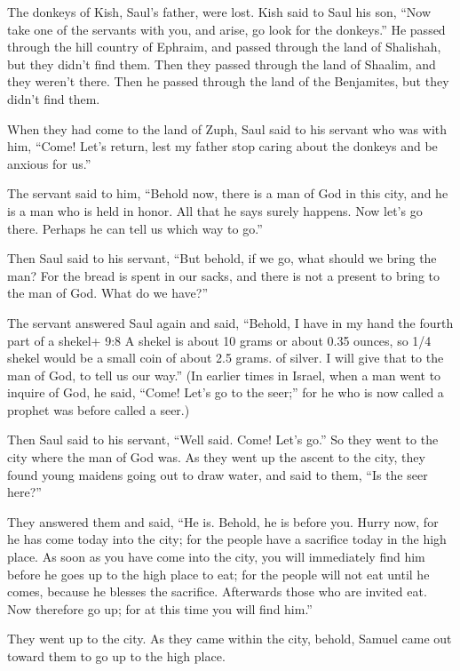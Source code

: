  The donkeys of Kish, Saul's father, were lost. Kish said to
Saul his son, ``Now take one of the servants with you, and arise, go
look for the donkeys.''  He passed through the hill country
of Ephraim, and passed through the land of Shalishah, but they didn't
find them. Then they passed through the land of Shaalim, and they
weren't there. Then he passed through the land of the Benjamites, but
they didn't find them.

 When they had come to the land of Zuph, Saul said to his
servant who was with him, ``Come! Let's return, lest my father stop
caring about the donkeys and be anxious for us.''

 The servant said to him, ``Behold now, there is a man of
God in this city, and he is a man who is held in honor. All that he says
surely happens. Now let's go there. Perhaps he can tell us which way to
go.''

 Then Saul said to his servant, ``But behold, if we go, what
should we bring the man? For the bread is spent in our sacks, and there
is not a present to bring to the man of God. What do we have?''

 The servant answered Saul again and said, ``Behold, I have
in my hand the fourth part of a shekel+ 9:8 A shekel is about 10 grams
or about 0.35 ounces, so 1/4 shekel would be a small coin of about 2.5
grams. of silver. I will give that to the man of God, to tell us our
way.''  (In earlier times in Israel, when a man went to
inquire of God, he said, ``Come! Let's go to the seer;'' for he who is
now called a prophet was before called a seer.)

 Then Saul said to his servant, ``Well said. Come! Let's
go.'' So they went to the city where the man of God was. 
As they went up the ascent to the city, they found young maidens going
out to draw water, and said to them, ``Is the seer here?''

 They answered them and said, ``He is. Behold, he is before
you. Hurry now, for he has come today into the city; for the people have
a sacrifice today in the high place.  As soon as you have
come into the city, you will immediately find him before he goes up to
the high place to eat; for the people will not eat until he comes,
because he blesses the sacrifice. Afterwards those who are invited eat.
Now therefore go up; for at this time you will find him.''

 They went up to the city. As they came within the city,
behold, Samuel came out toward them to go up to the high place.

